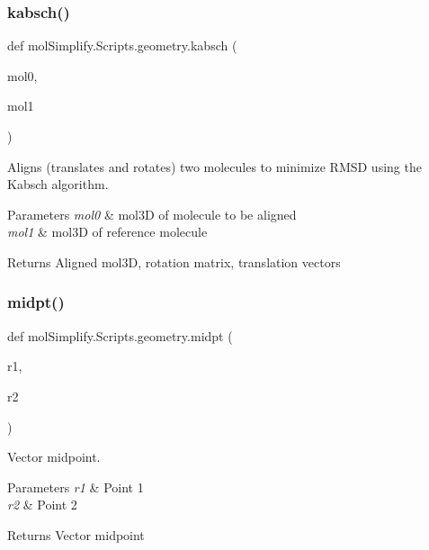 \subsubsection{\texorpdfstring{kabsch()}{kabsch()}}
{\footnotesize\ttfamily def mol\+Simplify.\+Scripts.\+geometry.\+kabsch (\begin{DoxyParamCaption}\item[{}]{mol0,  }\item[{}]{mol1 }\end{DoxyParamCaption})}



Aligns (translates and rotates) two molecules to minimize R\+M\+SD using the Kabsch algorithm. 


\begin{DoxyParams}{Parameters}
{\em mol0} & mol3D of molecule to be aligned \\
\hline
{\em mol1} & mol3D of reference molecule \\
\hline
\end{DoxyParams}
\begin{DoxyReturn}{Returns}
Aligned mol3D, rotation matrix, translation vectors 
\end{DoxyReturn}
\mbox{\label{namespacemolSimplify_1_1Scripts_1_1geometry_a05a77dc1d71d199b47473f48f992b101}} 
\subsubsection{\texorpdfstring{midpt()}{midpt()}}
{\footnotesize\ttfamily def mol\+Simplify.\+Scripts.\+geometry.\+midpt (\begin{DoxyParamCaption}\item[{}]{r1,  }\item[{}]{r2 }\end{DoxyParamCaption})}



Vector midpoint. 


\begin{DoxyParams}{Parameters}
{\em r1} & Point 1 \\
\hline
{\em r2} & Point 2 \\
\hline
\end{DoxyParams}
\begin{DoxyReturn}{Returns}
Vector midpoint 
\end{DoxyReturn}
\mbox{\label{namespacemolSimplify_1_1Scripts_1_1geometry_ab22dfc9103deb322f3fe52878f24aec9}} 
